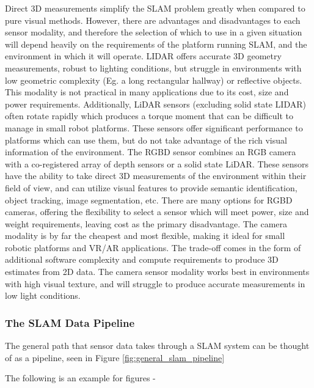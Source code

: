 Direct 3D measurements simplify the SLAM problem greatly when compared to pure visual methods. However, there are advantages and disadvantages to each sensor modality, and therefore the selection of which to use in a given situation will depend heavily on the requirements of the platform running SLAM, and the environment in which it will operate. LIDAR offers accurate 3D geometry measurements, robust to lighting conditions, but struggle in environments with low geometric complexity (Eg. a long rectangular hallway) or reflective objects. This modality is not practical in many applications due to its cost, size and power requirements. Additionally, LiDAR sensors (excluding solid state LIDAR) often rotate rapidly which produces a torque moment that can be difficult to manage in small robot platforms. These sensors offer significant performance to platforms which can use them, but do not take advantage of the rich visual information of the environment. The RGBD sensor combines an RGB camera with a co-registered array of depth sensors or a solid state LiDAR. These sensors have the ability to take direct 3D measurements of the environment within their field of view, and can utilize visual features to provide semantic identification, object tracking, image segmentation, etc. There are many options for RGBD cameras, offering the flexibility to select a sensor which will meet power, size and weight requirements, leaving cost as the primary disadvantage. The camera modality is by far the cheapest and most flexible, making it ideal for small robotic platforms and VR/AR applications. The trade-off comes in the form of additional software complexity and compute requirements to produce 3D estimates from 2D data. The camera sensor modality works best in environments with high visual texture, and will struggle to produce accurate measurements in low light conditions.

\subsubsection{The SLAM Data Pipeline}
The general path that sensor data takes through a SLAM system can be thought of as a pipeline, seen in Figure \ref{fig:general_slam_pipeline}

The following is an example for figures -

